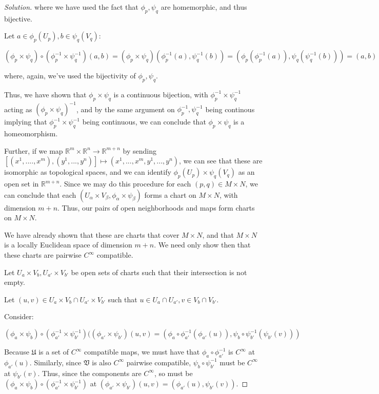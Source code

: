 \documentclass[10pt]{article}
\begin{document}
\begin{proof}[Solution]
where we have used the fact that $\phi_p, \psi_q$ are homemorphic, and thus bijective.

Let $a \in \phi_p(U_p), b \in \psi_q(V_q)$:

$$  (\phi_p \times \psi_q) \circ  (\phi_p^{-1} \times \psi_q^{-1}) (a,b) = (\phi_p \times \psi_q)(\phi_p^{-1}(a), \psi_q^{-1}(b)) = (\phi_p(\phi_p^{-1}(a)),  \psi_q(\psi_q^{-1}(b))) = (a,b)$$

where, again, we've used the bijectivity of $\phi_p, \psi_q$. 

Thus, we have shown that $\phi_p \times \psi_q$ is a continuous bijection, with $\phi_p^{-1} \times \psi_q^{-1}$ acting as $(\phi_p \times \psi_q)^{-1}$, and by the same argument on $\phi_p^{-1}, \psi_q^{-1}$ being continous implying that $\phi_p^{-1} \times \psi_q^{-1}$ being continuous, we can conclude that $\phi_p \times \psi_q$ is a homeomorphism.

Further, if we map $\mathbb{R}^m \times \mathbb{R}^n \to \mathbb{R}^{m+n}$ by sending $[(x^1,....,x^m),(y^1,...,y^n)] \mapsto (x^1,...,x^m,y^1,...,y^n)$, we can see that these are isomorphic as topological spaces, and we can identify $\phi_p(U_p) \times \psi_q(V_q)$ as an open set in $\mathbb{R}^{m+n}$. Since we may do this procedure for each $(p,q) \in M \times N$, we can conclude that each $(U_\alpha \times V_\beta, \phi_\alpha \times \psi_\beta)$ forms a chart on $M \times N$, with dimension $m+n$. Thus, our pairs of open neighborhoods and maps form charts on $M \times N$. 

We have already shown that these are charts that cover $M \times N$, and that $M \times N$ is a locally Euclidean space of dimension $m +n$. We need only show then that these charts are pairwise $C^\infty$ compatible. 

Let $U_a \times V_b, U_{a'} \times V_{b'}$ be open sets of charts such that their intersection is not empty. 

Let $(u,v) \in U_a \times V_b \cap U_{a'} \times V_{b'}$ such that $u \in U_a \cap U_{a'}, v \in V_b \cap V_{b'}$. 

Consider:

$$(\phi_a \times \psi_b) \circ (\phi_{a'}^{-1} \times \psi_{b'}^{-1}) ( (\phi_{a'} \times \psi_{b'})(u,v) = (\phi_a \circ \phi_{a'}^{-1} (\phi_{a'}(u)), \psi_b \circ \psi_{b'}^{-1}(\psi_{b'}(v)))$$

Because $\mathfrak{U}$ is a set of $C^\infty$ compatible maps, we must have that $\phi_a \circ \phi_{a'}^{-1}$ is $C^\infty$ at $\phi_{a'}(u)$. Similarly, since $\mathfrak{V}$ is also $C^\infty$ pairwise compatible, $\psi_b \circ \psi_{b'}^{-1}$ must be $C^\infty$ at $\psi_{b'}(v)$. Thus, since the components are $C^\infty$, so must be $(\phi_a \times \psi_b) \circ (\phi_{a'}^{-1} \times \psi_{b'}^{-1})$ at $(\phi_{a'} \times \psi_{b'})(u,v) = (\phi_{a'}(u), \psi_{b'}(v))$.


\end{proof}
\end{document}
